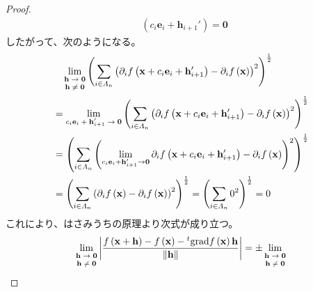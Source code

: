 \documentclass[dvipdfmx]{jsarticle}
\begin{document}
\begin{proof}
\begin{align*}
{\begin{matrix}
\end{matrix}}\left( c_{i}\mathbf{e}_{i} + \mathbf{h}_{i + 1}' \right) = \mathbf{0}
\end{align*}
したがって、次のようになる。
\begin{align*}
&\quad \lim_{\scriptsize \begin{matrix}
\mathbf{h} \rightarrow \mathbf{0} \\
\mathbf{h} \neq \mathbf{0} \\
\end{matrix}}\left( \sum_{i \in \varLambda_{n}} \left( \partial_{i}f\left( \mathbf{x} + c_{i}\mathbf{e}_{i} + \mathbf{h}_{i + 1}' \right) - \partial_{i}f\left( \mathbf{x} \right) \right)^{2} \right)^{\frac{1}{2}}\\
&= \lim_{\scriptsize \begin{matrix}
c_{i}\mathbf{e}_{i} + \mathbf{h}_{i + 1}' \rightarrow \mathbf{0} \\
\end{matrix}}\left( \sum_{i \in \varLambda_{n}} \left( \partial_{i}f\left( \mathbf{x} + c_{i}\mathbf{e}_{i} + \mathbf{h}_{i + 1}' \right) - \partial_{i}f\left( \mathbf{x} \right) \right)^{2} \right)^{\frac{1}{2}}\\
&= \left( \sum_{i \in \varLambda_{n}} \left( \lim_{c_{i}\mathbf{e}_{i} + \mathbf{h}_{i + 1}' \rightarrow \mathbf{0}}{\partial_{i}f\left( \mathbf{x} + c_{i}\mathbf{e}_{i} + \mathbf{h}_{i + 1}' \right)} - \partial_{i}f\left( \mathbf{x} \right) \right)^{2} \right)^{\frac{1}{2}}\\
&= \left( \sum_{i \in \varLambda_{n}} \left( \partial_{i}f\left( \mathbf{x} \right) - \partial_{i}f\left( \mathbf{x} \right) \right)^{2} \right)^{\frac{1}{2}} = \left( \sum_{i \in \varLambda_{n}} 0^{2} \right)^{\frac{1}{2}} = 0
\end{align*}
これにより、はさみうちの原理より次式が成り立つ。
\begin{align*}
\lim_{\scriptsize \begin{matrix}
\mathbf{h} \rightarrow \mathbf{0} \\
\mathbf{h} \neq \mathbf{0} \\
\end{matrix}}\left| \frac{f\left( \mathbf{x} + \mathbf{h} \right) - f\left( \mathbf{x} \right) -{}^{t}\mathrm{grad}f\left( \mathbf{x} \right)\mathbf{h}}{\left\| \mathbf{h} \right\|} \right| = \pm \lim_{\scriptsize \begin{matrix}
\mathbf{h} \rightarrow \mathbf{0} \\
\mathbf{h} \neq \mathbf{0} \\

\end{matrix}}
\end{align*}
\end{proof}
\end{document}

